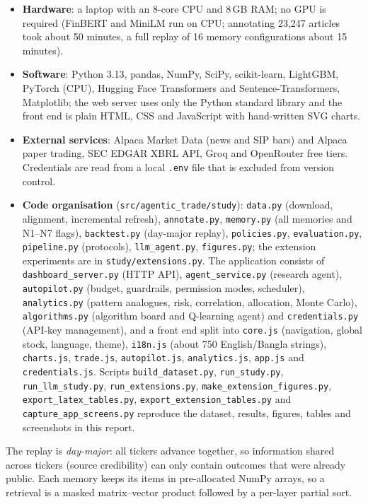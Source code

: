 \begin{itemize}
  \item \textbf{Hardware}: a laptop with an 8-core CPU and 8\,GB RAM; no GPU is required (FinBERT and MiniLM run on CPU; annotating 23{,}247 articles took about 50 minutes, a full replay of 16 memory configurations about 15 minutes).
  \item \textbf{Software}: Python 3.13, pandas, NumPy, SciPy, scikit-learn, LightGBM, PyTorch (CPU), Hugging Face Transformers and Sentence-Transformers, Matplotlib; the web server uses only the Python standard library and the front end is plain HTML, CSS and JavaScript with hand-written SVG charts.
  \item \textbf{External services}: Alpaca Market Data (news and SIP bars) and Alpaca paper trading, SEC EDGAR XBRL API, Groq and OpenRouter free tiers. Credentials are read from a local \texttt{.env} file that is excluded from version control.
  \item \textbf{Code organisation} (\texttt{src/agentic\_trade/study}): \texttt{data.py} (download, alignment, incremental refresh), \texttt{annotate.py}, \texttt{memory.py} (all memories and N1--N7 flags), \texttt{backtest.py} (day-major replay), \texttt{policies.py}, \texttt{evaluation.py}, \texttt{pipeline.py} (protocols), \texttt{llm\_agent.py}, \texttt{figures.py}; the extension experiments are in \texttt{study/extensions.py}. The application consists of \texttt{dashboard\_server.py} (HTTP API), \texttt{agent\_service.py} (research agent), \texttt{autopilot.py} (budget, guardrails, permission modes, scheduler), \texttt{analytics.py} (pattern analogues, risk, correlation, allocation, Monte Carlo), \texttt{algorithms.py} (algorithm board and Q-learning agent) and \texttt{credentials.py} (API-key management), and a front end split into \texttt{core.js} (navigation, global stock, language, theme), \texttt{i18n.js} (about 750 English/Bangla strings), \texttt{charts.js}, \texttt{trade.js}, \texttt{autopilot.js}, \texttt{analytics.js}, \texttt{app.js} and \texttt{credentials.js}. Scripts \texttt{build\_dataset.py}, \texttt{run\_study.py}, \texttt{run\_llm\_study.py}, \texttt{run\_extensions.py}, \texttt{make\_extension\_figures.py}, \texttt{export\_latex\_tables.py}, \texttt{export\_extension\_tables.py} and \texttt{capture\_app\_screens.py} reproduce the dataset, results, figures, tables and screenshots in this report.
\end{itemize}

The replay is \emph{day-major}: all tickers advance together, so information shared across tickers (source credibility) can only contain outcomes that were already public. Each memory keeps its items in pre-allocated NumPy arrays, so a retrieval is a masked matrix--vector product followed by a per-layer partial sort.

